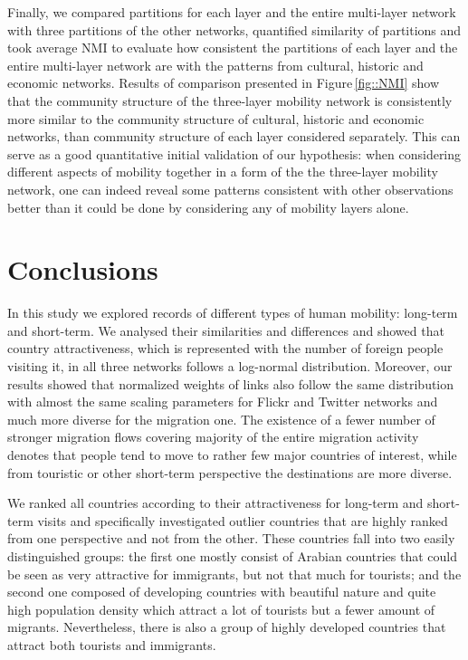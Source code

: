 \documentclass[aps,superscriptaddress,showkeys,nofootinbib]{revtex4-1}
\begin{document}
Finally, we compared partitions for each layer and the entire multi-layer network with three partitions of the other networks, quantified similarity of partitions and took average NMI to evaluate how consistent the partitions of each layer and the entire multi-layer network are with the patterns from cultural, historic and economic networks. Results of comparison presented in Figure\,\ref{fig::NMI} show that the community structure of the three-layer mobility network is consistently more similar to the community structure of cultural, historic and economic networks, than community structure of each layer considered separately. This can serve as a good quantitative initial validation of our hypothesis: when considering different aspects of mobility together in a form of the the three-layer mobility network, one can indeed reveal some patterns consistent with other observations better than it could be done by considering any of mobility layers alone.

\section*{Conclusions}
\label{sec:conclusion}

In this study we explored records of different types of human mobility: long-term and short-term. We analysed their similarities and differences and showed that country attractiveness, which is represented with the number of foreign people visiting it, in all three networks follows a log-normal distribution. Moreover, our results showed that normalized weights of links also follow the same distribution with almost the same scaling parameters for Flickr and Twitter networks and much more diverse for the migration one. The existence of a fewer number of stronger migration flows covering majority of the entire migration activity denotes that people tend to move to rather few major countries of interest, while from touristic or other short-term perspective the destinations are more diverse.

We ranked all countries according to their attractiveness for long-term and short-term visits and specifically investigated outlier countries that are highly ranked from one perspective and not from the other. These countries fall into two easily distinguished groups: the first one mostly consist of Arabian countries that could be seen as very attractive for immigrants, but not that much for tourists; and the second one composed of developing countries with beautiful nature and quite high population density which attract a lot of tourists but a fewer amount of migrants. Nevertheless, there is also a group of highly developed countries that attract both tourists and immigrants.
\end{document}

